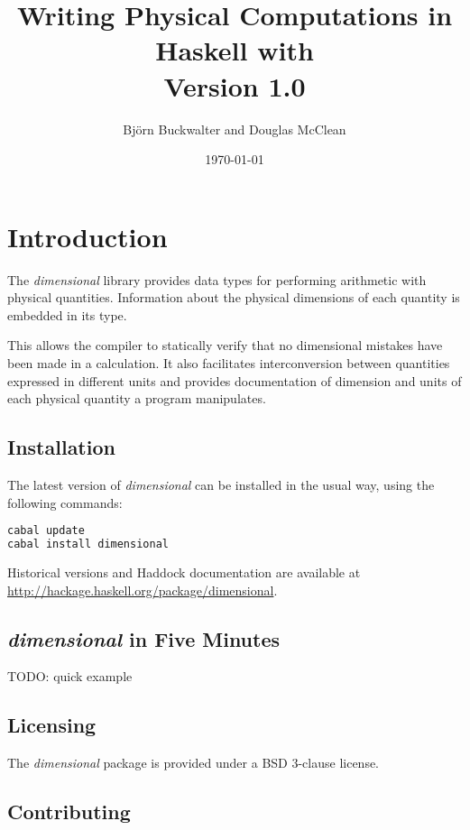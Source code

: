\documentclass[12pt]{report}
\title{
	{Writing Physical Computations in Haskell with \thispackage}\\
	{\small{Version 1.0}}
}
\author{Björn Buckwalter and Douglas McClean}
\date{\today}
\newcommand{\packagename}[1]{\textit{#1}}
\newcommand{\thispackage}{\packagename{dimensional}}
\begin{document}
\maketitle

\tableofcontents

\chapter{Introduction}

The \thispackage{} library provides data types for performing arithmetic with physical
quantities. Information about the physical dimensions of each quantity is embedded in
its type.

This allows the compiler to statically verify that no dimensional mistakes have been
made in a calculation. It also facilitates interconversion between quantities expressed
in different units and provides documentation of dimension and units of each physical
quantity a program manipulates.

\section{Installation}

The latest version of \thispackage{} can be installed in the usual way, using the following commands:

\begin{lstlisting}[language=bash]
cabal update
cabal install dimensional
\end{lstlisting}

Historical versions and Haddock documentation are available at \url{http://hackage.haskell.org/package/dimensional}.

\section{\thispackage{} in Five Minutes}

TODO: quick example

\section{Licensing}

The \thispackage{} package is provided under a BSD 3-clause license.

\section{Contributing}
\end{document}
